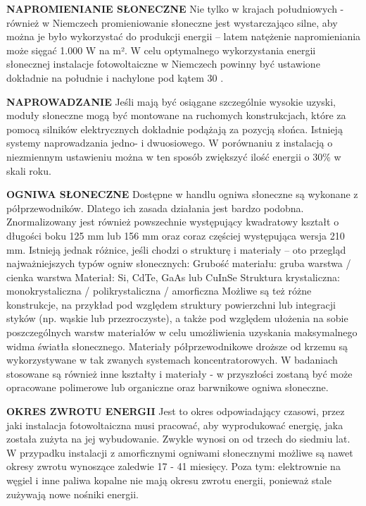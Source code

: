 \documentclass[12pt,a4paper]{article}
\begin{document}
\textbf{NAPROMIENIANIE SŁONECZNE}
Nie tylko w krajach południowych - również w Niemczech promieniowanie słoneczne jest wystarczająco silne, aby można je było wykorzystać do produkcji energii – latem natężenie napromieniania może sięgać 1.000 W na m². W celu optymalnego wykorzystania energii słonecznej instalacje fotowoltaiczne w Niemczech powinny być ustawione dokładnie na południe i nachylone pod kątem 30 \degree.


\textbf{NAPROWADZANIE} 
Jeśli mają być osiągane szczególnie wysokie uzyski, moduły słoneczne mogą być montowane na ruchomych konstrukcjach, które za pomocą silników elektrycznych dokładnie podążają za pozycją słońca. Istnieją systemy naprowadzania jedno- i dwuosiowego. W porównaniu z instalacją o niezmiennym ustawieniu można w ten sposób zwiększyć ilość energii o 30\% w skali roku.


\textbf{OGNIWA SŁONECZNE} 
Dostępne w handlu ogniwa słoneczne są wykonane z półprzewodników. Dlatego ich zasada działania jest bardzo podobna. Znormalizowany jest również powszechnie występujący kwadratowy kształt o długości boku 125 mm lub 156 mm oraz coraz częściej występująca wersja 210 mm. Istnieją jednak różnice, jeśli chodzi o strukturę i materiały – oto przegląd najważniejszych typów ogniw słonecznych:
Grubość materiału:	gruba warstwa / cienka warstwa
Materiał:	Si, CdTe, GaAs lub CuInSe
Struktura krystaliczna:	monokrystaliczna / polikrystaliczna / amorficzna
Możliwe są też różne konstrukcje, na przykład pod względem struktury powierzchni lub integracji styków (np. wąskie lub przezroczyste), a także pod względem ułożenia na sobie poszczególnych warstw materiałów w celu umożliwienia uzyskania maksymalnego widma światła słonecznego.
Materiały półprzewodnikowe droższe od krzemu są wykorzystywane w tak zwanych systemach koncentratorowych. W badaniach stosowane są również inne kształty i materiały - w przyszłości zostaną być może opracowane polimerowe lub organiczne oraz barwnikowe ogniwa słoneczne.

\textbf{OKRES ZWROTU ENERGII}
Jest to okres odpowiadający czasowi, przez jaki instalacja fotowoltaiczna musi pracować, aby wyprodukować energię, jaka została zużyta na jej wybudowanie. Zwykle wynosi on od trzech do siedmiu lat. W przypadku instalacji z amorficznymi ogniwami słonecznymi możliwe są nawet okresy zwrotu wynoszące zaledwie 17 - 41 miesięcy. Poza tym: elektrownie na węgiel i inne paliwa kopalne nie mają okresu zwrotu energii, ponieważ stale zużywają nowe nośniki energii.
\end{document}
